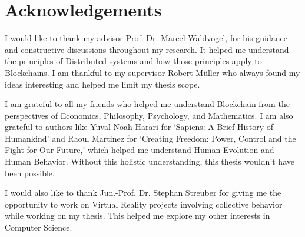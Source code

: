 \chapter{Acknowledgements}
	I would like to thank my advisor Prof. Dr. Marcel Waldvogel, for his guidance and constructive discussions throughout my research. It helped me understand the principles of Distributed systems and how those principles apply to Blockchains. I am thankful to my supervisor Robert Müller who always found my ideas interesting and helped me limit my thesis scope.
	
	I am grateful to all my friends who helped me understand Blockchain from the perspectives of Economics, Philosophy, Psychology, and Mathematics. I am also grateful to authors like Yuval Noah Harari for `Sapiens: A Brief History of Humankind' and Raoul Martinez for `Creating Freedom: Power, Control and the Fight for Our Future,' which helped me understand Human Evolution and Human Behavior.  Without this holistic understanding, this thesis wouldn't have been possible.
	
	I would also like to thank Jun.-Prof. Dr. Stephan Streuber for giving me the opportunity to work on Virtual Reality projects involving collective behavior while working on my thesis. This helped me explore my other interests in Computer Science.